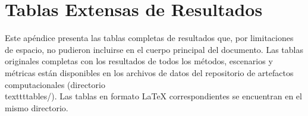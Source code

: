 \chapter{Tablas Extensas de Resultados}
\label{ap:tablas_extensas}

Este apéndice presenta las tablas completas de resultados que, por limitaciones de espacio, no pudieron incluirse en el cuerpo principal del documento. Las tablas originales completas con los resultados de todos los métodos, escenarios y métricas están disponibles en los archivos de datos del repositorio de artefactos computacionales (directorio \\texttt{tables/}). Las tablas en formato LaTeX correspondientes se encuentran en el mismo directorio.
